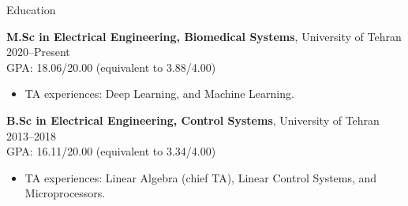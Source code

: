 \documentclass{resume} %
\begin{document}
	\vspace{-1.5em}
	\begin{rSection}{Education}
		
		{\bf M.Sc in Electrical Engineering, Biomedical Systems}, University of Tehran \hfill {2020--Present}\\
		GPA: 18.06/20.00 (equivalent to 3.88/4.00)
		\begin{itemize}
			\item TA experiences: Deep Learning, and Machine Learning.
		\end{itemize}	


		
		{\bf B.Sc in Electrical Engineering, Control Systems}, University of Tehran \hfill {2013--2018}\\
		GPA: 16.11/20.00 (equivalent to 3.34/4.00)
			\begin{itemize}
			\item TA experiences: Linear Algebra (chief TA), Linear Control Systems, and Microprocessors.
		\end{itemize}	
			
		
	\end{rSection}
	
\end{document}
